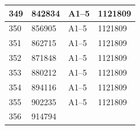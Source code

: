 \documentclass[UTF8,10pt,a4paper,fontset=fandol]{ctexart}
\newcommand{\fieldvalue}[1]{#1}
\begin{document}
\begin{center}
\begin{tabular}{|l|l|l|l|}
\hline
\fieldvalue{349}&
\fieldvalue{842834}&
\fieldvalue{A1--5}&
\fieldvalue{1121809}\\
\hline
\fieldvalue{350}&
\fieldvalue{856905}&
\fieldvalue{A1--5}&
\fieldvalue{1121809}\\
\hline
\fieldvalue{351}&
\fieldvalue{862715}&
\fieldvalue{A1--5}&
\fieldvalue{1121809}\\
\hline
\fieldvalue{352}&
\fieldvalue{871848}&
\fieldvalue{A1--5}&
\fieldvalue{1121809}\\
\hline
\fieldvalue{353}&
\fieldvalue{880212}&
\fieldvalue{A1--5}&
\fieldvalue{1121809}\\
\hline
\fieldvalue{354}&
\fieldvalue{894116}&
\fieldvalue{A1--5}&
\fieldvalue{1121809}\\
\hline
\fieldvalue{355}&
\fieldvalue{902235}&
\fieldvalue{A1--5}&
\fieldvalue{1121809}\\
\hline
\fieldvalue{356}&
\fieldvalue{914794}&

\end{tabular}
\end{center}
\end{document}
